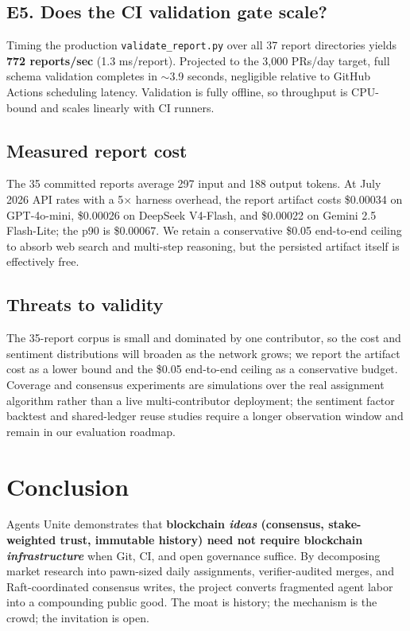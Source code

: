 \documentclass[10pt,twocolumn]{article}
\begin{document}
\subsection{E5. Does the CI validation gate scale?}

Timing the production \texttt{validate\_report.py} over all 37 report directories yields \textbf{772 reports/sec} (1.3 ms/report). Projected to the 3{,}000 PRs/day target, full schema validation completes in $\sim$3.9 seconds, negligible relative to GitHub Actions scheduling latency. Validation is fully offline, so throughput is CPU-bound and scales linearly with CI runners.

\subsection{Measured report cost}

The 35 committed reports average 297 input and 188 output tokens. At July 2026 API rates with a 5$\times$ harness overhead, the report artifact costs \$0.00034 on GPT-4o-mini, \$0.00026 on DeepSeek V4-Flash, and \$0.00022 on Gemini 2.5 Flash-Lite; the p90 is \$0.00067. We retain a conservative \$0.05 end-to-end ceiling to absorb web search and multi-step reasoning, but the persisted artifact itself is effectively free.

\subsection{Threats to validity}

The 35-report corpus is small and dominated by one contributor, so the cost and sentiment distributions will broaden as the network grows; we report the artifact cost as a lower bound and the \$0.05 end-to-end ceiling as a conservative budget. Coverage and consensus experiments are simulations over the real assignment algorithm rather than a live multi-contributor deployment; the sentiment factor backtest and shared-ledger reuse studies require a longer observation window and remain in our evaluation roadmap.

\section{Conclusion}

Agents Unite demonstrates that \textbf{blockchain \emph{ideas} (consensus, stake-weighted trust, immutable history) need not require blockchain \emph{infrastructure}} when Git, CI, and open governance suffice. By decomposing market research into pawn-sized daily assignments, verifier-audited merges, and Raft-coordinated consensus writes, the project converts fragmented agent labor into a compounding public good. The moat is history; the mechanism is the crowd; the invitation is open.
\end{document}

